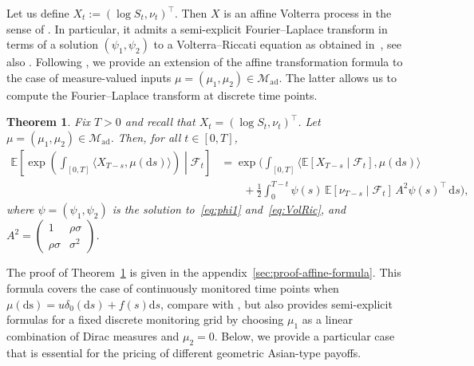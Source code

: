 \documentclass[10pt,a4paper,reqno]{amsart}
\theoremstyle{plain}
\newtheorem{theorem}{Theorem}[section]
\theoremstyle{definition}
\theoremstyle{remark}
\theoremstyle{example}
\begin{document}
Let us define $X_t := (\log S_t,\nu_t)^\top$. Then $X$ is an affine Volterra process in the sense of \cite{abi2019affine}. In particular, it admits a semi-explicit Fourier--Laplace transform in terms of a solution $(\psi_1, \psi_2)$ to a Volterra--Riccati equation as obtained in~\cite[Section 7]{abi2019affine}, see also \cite{ElEuchRosenbaum2019}. Following \cite{friesen2024volterra}, we provide an extension of the affine transformation formula to the case of measure-valued inputs $\mu = (\mu_1, \mu_2) \in \mathcal{M}_{\mathrm{ad}}$. The latter allows us to compute the Fourier--Laplace transform at discrete time points.

\begin{theorem}\label{cor:CorsolRicVolmeasure}
    Fix $T > 0$ and recall that $X_t = (\log S_t, \nu_t)^{\top}$. Let $\mu=(\mu_1,\mu_2)\in\mathcal{M}_{\mathrm{ad}}$. Then, for all $t\in[0,T]$,
\begin{align*}
    \mathbb{E}\left[\exp\left(\int_{[0,T]}\langle X_{T-s},\mu(\mathrm{d}s)\rangle\right)\middle|\mathcal{F}_t\right]
    &= \exp\Bigg( \int_{[0,T]} \langle \mathbb{E}[X_{T-s}\mid\mathcal{F}_t],\mu(\mathrm{d}s)\rangle 
    \\  &\qquad + \tfrac{1}{2}\int_0^{T-t}\psi(s)\, \mathbb{E}[\nu_{T-s}\mid\mathcal{F}_t]\,
        A^2\psi(s)^\top\,\mathrm{d}s
    \Bigg),
	\end{align*}
	where $\psi = (\psi_1, \psi_2)$ is the solution to~\eqref{eq:phi1} and~\eqref{eq:VolRic}, and $A^2 = \begin{pmatrix}1 & \rho \sigma \\ \rho \sigma & \sigma^2 \end{pmatrix}$. 
\end{theorem}

The proof of Theorem~\ref{cor:CorsolRicVolmeasure} is given in the appendix~\ref{sec:proof-affine-formula}. This formula covers the case of continuously monitored time points when $\mu(\mathrm{ds}) = u \delta_0(\mathrm{d}s) + f(s)\mathrm{d}s$, compare with \cite[Thm. 4.3]{aichinger2024pricing}, but also provides semi-explicit formulas for a fixed discrete monitoring grid by choosing $\mu_1$ as a linear combination of Dirac measures and $\mu_2 = 0$. Below, we provide a particular case that is essential for the pricing of different geometric Asian-type payoffs. 
\end{document}
